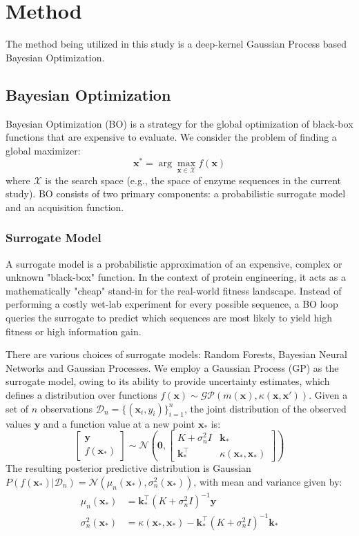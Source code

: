 \documentclass{article}
\theoremstyle{plain}
\theoremstyle{definition}
\theoremstyle{remark}
\begin{document}
\section{Method}
The method being utilized in this study is a deep-kernel Gaussian Process based Bayesian Optimization. 
\subsection{Bayesian Optimization}
Bayesian Optimization (BO) is a strategy for the global optimization of black-box functions that are expensive to evaluate. We consider the problem of finding a global maximizer:
\begin{equation}
    \mathbf{x}^* = \arg\max_{\mathbf{x} \in \mathcal{X}} f(\mathbf{x})
\end{equation}
where $\mathcal{X}$ is the search space (e.g., the space of enzyme sequences in the current study). BO consists of two primary components: a probabilistic surrogate model and an acquisition function.
\subsubsection{Surrogate Model}
A surrogate model is a probabilistic approximation of an expensive, complex or unknown "black-box" function. In the context of protein engineering, it acts as a mathematically "cheap" stand-in for the real-world fitness landscape. Instead of performing a costly wet-lab experiment for every possible sequence, a BO loop queries the surrogate to predict which sequences are most likely to yield high fitness or high information gain. 

There are various choices of surrogate models: Random Forests, Bayesian Neural Networks and Gaussian Processes. We employ a Gaussian Process (GP) as the surrogate model, owing to its ability to provide uncertainty estimates, which defines a distribution over functions $f(\mathbf{x}) \sim \mathcal{GP}(m(\mathbf{x}), \kappa(\mathbf{x}, \mathbf{x}'))$. Given a set of $n$ observations $\mathcal{D}_n = \{(\mathbf{x}_i, y_i)\}_{i=1}^n$, the joint distribution of the observed values $\mathbf{y}$ and a function value at a new point $\mathbf{x}_*$ is:
\begin{equation}
    \begin{bmatrix} \mathbf{y} \\ f(\mathbf{x}_*) \end{bmatrix} \sim \mathcal{N} \left( \mathbf{0}, \begin{bmatrix} K + \sigma_n^2 I & \mathbf{k}_* \\ \mathbf{k}_*^\top & \kappa(\mathbf{x}_*, \mathbf{x}_*) \end{bmatrix} \right)
\end{equation}
The resulting posterior predictive distribution is Gaussian $P(f(\mathbf{x}_*)|\mathcal{D}_n) = \mathcal{N}(\mu_n(\mathbf{x}_*), \sigma_n^2(\mathbf{x}_*))$, with mean and variance given by:
\begin{align}
    \mu_n(\mathbf{x}_*) &= \mathbf{k}_*^\top (K + \sigma_n^2 I)^{-1} \mathbf{y} \\
    \sigma_n^2(\mathbf{x}_*) &= \kappa(\mathbf{x}_*, \mathbf{x}_*) - \mathbf{k}_*^\top (K + \sigma_n^2 I)^{-1} \mathbf{k}_*
\end{align}
\end{document}
